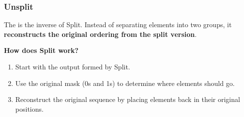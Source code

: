 \subsubsection{Unsplit}

The  is the inverse of Split. Instead of separating elements into two groups, it \textbf{reconstructs the original ordering from the split version}.

\highspace
\begin{flushleft}
    \textcolor{Green3}{ \textbf{How does Split work?}}
\end{flushleft}
\begin{enumerate}
    \item Start with the output formed by Split.
    \item Use the original mask (0s and 1s) to determine where elements should go.
    \item Reconstruct the original sequence by placing elements back in their original positions.
\end{enumerate}

